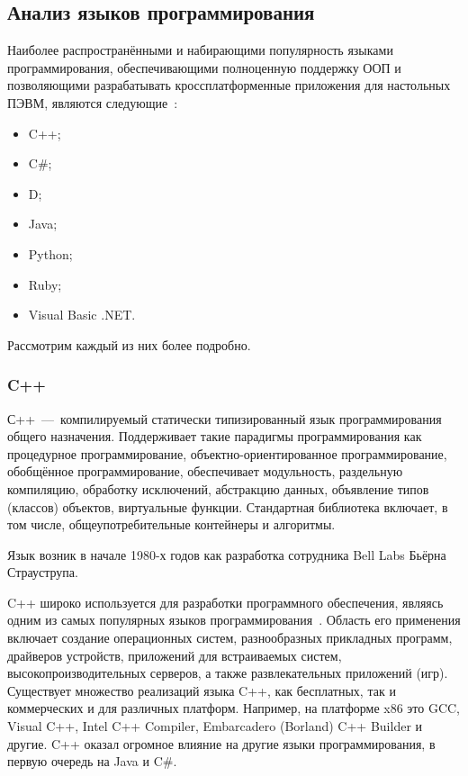 \subsection{Анализ языков программирования}
Наиболее распространёнными и набирающими популярность языками программирования, обеспечивающими полноценную поддержку ООП и позволяющими разрабатывать кроссплатформенные приложения для настольных ПЭВМ, являются следующие~\cite{TIOBELanguageIndex}:
\begin{itemize}
	\item C++;
	\item C\#;
	\item D;
	\item Java;
	\item Python;
	\item Ruby;
	\item Visual Basic .NET.
\end{itemize}

Рассмотрим каждый из них более подробно.

\subsubsection{C++}
С++~---~компилируемый статически типизированный язык программирования общего назначения. Поддерживает такие парадигмы программирования как процедурное программирование, объектно-ориентированное программирование, обобщённое программирование, обеспечивает модульность, раздельную компиляцию, обработку исключений, абстракцию данных, объявление типов (классов) объектов, виртуальные функции. Стандартная библиотека включает, в том числе, общеупотребительные контейнеры и алгоритмы.

Язык возник в начале 1980-х годов как разработка сотрудника Bell Labs Бьёрна Страуструпа. 

C++ широко используется для разработки программного обеспечения, являясь одним из самых популярных языков программирования~\cite{TIOBELanguageIndex}. Область его применения включает создание операционных систем, разнообразных прикладных программ, драйверов устройств, приложений для встраиваемых систем, высокопроизводительных серверов, а также развлекательных приложений (игр). Существует множество реализаций языка C++, как бесплатных, так и коммерческих и для различных платформ. Например, на платформе x86 это GCC, Visual C++, Intel C++ Compiler, Embarcadero (Borland) C++ Builder и другие. C++ оказал огромное влияние на другие языки программирования, в первую очередь на Java и C\#.

